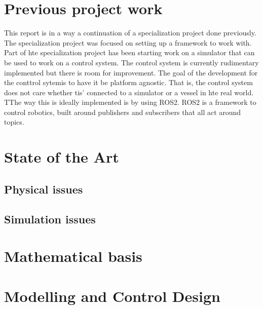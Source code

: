 \documentclass[class=article, crop=false, draft=true]{standalone}
\begin{document}
\section{Previous project work}
This report is in a way a continuation of a specialization project\cite{specialization} done previously. The specialization project was focused on setting up a framework to work with. Part of hte specialization project has been starting work on a simulator that can be used to work on a control system. The control system is currently rudimentary implemented but there is room for improvement. The goal of the development for the conttrol sytemis to have it be platform agnostic. That is, the control system does not care whether tis' connected to a simulator or a vessel in hte real world. TThe way this is ideally implemented is by using ROS2. ROS2 is a framework to control robotics, built around publishers and subscribers that all act around topics.



\section{State of the Art}
\subsection{Physical issues}
\subsection{Simulation issues}

\section{Mathematical basis}

\section{Modelling and Control Design}
\end{document}
